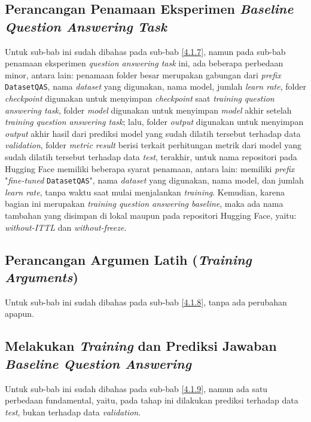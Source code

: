 \subsection{Perancangan Penamaan Eksperimen \emph{Baseline Question Answering Task}}
\label{4.2.7}
Untuk sub-bab ini sudah dibahas pada sub-bab \ref{4.1.7}, namun pada sub-bab penamaan eksperimen \emph{question answering task} ini, ada beberapa perbedaan minor, antara lain: penamaan folder besar merupakan gabungan dari \emph{prefix} \texttt{DatasetQAS}, nama \emph{dataset} yang digunakan, nama model, jumlah \emph{learn rate}, folder \emph{checkpoint} digunakan untuk menyimpan \emph{checkpoint} saat \emph{training} \emph{question answering task}, folder \emph{model} digunakan untuk menyimpan \emph{model} akhir setelah \emph{training} \emph{question answering task}; lalu, folder \emph{output} digunakan untuk menyimpan \emph{output} akhir hasil dari prediksi model yang sudah dilatih tersebut terhadap data \emph{validation}, folder \emph{metric result} berisi terkait perhitungan metrik dari model yang sudah dilatih tersebut terhadap data \emph{test}, terakhir, untuk nama repositori pada Hugging Face memiliki beberapa syarat penamaan, antara lain: memiliki \emph{prefix} "\emph{fine-tuned} \texttt{DatasetQAS}", nama \emph{dataset} yang digunakan, nama model, dan jumlah \emph{learn rate}, tanpa waktu saat mulai menjalankan \emph{training}. Kemudian, karena bagian ini merupakan \emph{training question answering baseline}, maka ada nama tambahan yang disimpan di lokal maupun pada repositori Hugging Face, yaitu: \emph{without-ITTL} dan \emph{without-freeze}.

\subsection{Perancangan Argumen Latih (\emph{Training Arguments})}
\label{4.2.8}
Untuk sub-bab ini sudah dibahas pada sub-bab \ref{4.1.8}, tanpa ada perubahan apapun.

\subsection{Melakukan \emph{Training} dan Prediksi Jawaban \emph{Baseline Question Answering}}
\label{4.2.9}
Untuk sub-bab ini sudah dibahas pada sub-bab \ref{4.1.9}, namun ada satu perbedaan fundamental, yaitu, pada tahap ini dilakukan prediksi terhadap data \emph{test}, bukan terhadap data \emph{validation}.

